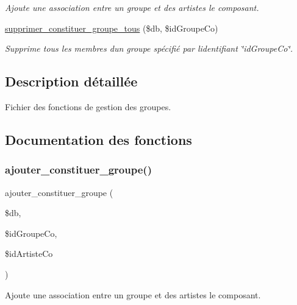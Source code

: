 \begin{DoxyCompactItemize}
\begin{DoxyCompactList}\small\item\em Ajoute une association entre un groupe et des artistes le composant. \end{DoxyCompactList}\item 
\hyperlink{fonctionGroupe_8php_aa892ed08a68e4ad21dc2619405477c22}{supprimer\+\_\+constituer\+\_\+groupe\+\_\+tous} (\$db, \$id\+Groupe\+Co)
\begin{DoxyCompactList}\small\item\em Supprime tous les membres d\textquotesingle{}un groupe spécifié par l\textquotesingle{}identifiant \char`\"{}id\+Groupe\+Co\char`\"{}. \end{DoxyCompactList}\end{DoxyCompactItemize}


\subsection{Description détaillée}
Fichier des fonctions de gestion des groupes. 



\subsection{Documentation des fonctions}
\mbox{\label{fonctionGroupe_8php_a7c4047a36849390ebe535ec018c631b0}} 
\subsubsection{\texorpdfstring{ajouter\+\_\+constituer\+\_\+groupe()}{ajouter\_constituer\_groupe()}}
{\footnotesize\ttfamily ajouter\+\_\+constituer\+\_\+groupe (\begin{DoxyParamCaption}\item[{}]{\$db,  }\item[{}]{\$id\+Groupe\+Co,  }\item[{}]{\$id\+Artiste\+Co }\end{DoxyParamCaption})}



Ajoute une association entre un groupe et des artistes le composant. 


